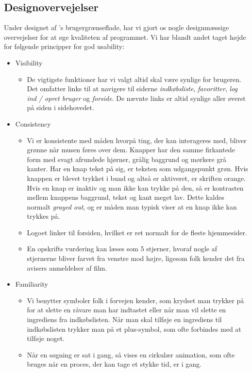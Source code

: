 \subsection{Designovervejelser}
\label{subsec:designovervejelser}

Under designet af \Foodl's brugergrænseflade, har vi gjort os nogle designmæssige overvejelser for at øge kvaliteten af programmet. Vi har blandt andet taget højde for følgende principper for god usability\cite[p.~90]{deb}:
\begin{itemize}

\item Visibility
  \begin{itemize}
  \item De vigtigste funktioner har vi valgt altid skal være synlige for brugeren. Det omfatter links til at navigere til siderne \textit{indkøbsliste}, \textit{favoritter}, \textit{log ind / opret bruger} og \textit{forside}. De nævnte links er altid synlige aller øverst på siden i sidehovedet.
  \end{itemize}
  
\item Consistency
  \begin{itemize}
  \item Vi er konsistente med måden hvorpå ting, der kan interageres med, bliver grønne når musen føres over dem. Knapper har den samme firkantede form med svagt afrundede hjørner, grålig baggrund og mørkere grå kanter. Har en knap tekst på sig, er teksten som udgangspunkt grøn. Hvis knappen er blevet trykket i bund og altså er aktiveret, er skriften orange. Hvis en knap er inaktiv og man ikke kan trykke på den, så er kontrasten mellem knappens baggrund, tekst og kant meget lav. Dette kaldes normalt \textit{grayed out}, og er måden man typisk viser at en knap ikke kan trykkes på.
  \item Logoet linker til forsiden, hvilket er ret normalt for de fleste hjemmesider.
  \item En opskrifts vurdering kan læses som 5 stjerner, hvoraf nogle af stjernerne bliver farvet fra venstre mod højre, ligesom folk kender det fra \fx avisers anmeldelser af film.
  \end{itemize}
  
\item Familiarity
  \begin{itemize}
  \item Vi benytter symboler folk i forvejen kender, som \fx krydset man trykker på for at slette en råvare man har indtastet eller når man vil slette en ingrediens fra indkøbslisten. Når man skal tilføje en ingrediens til indkøbslisten trykker man på et plus-symbol, som ofte forbindes med at tilføje noget.
  \item Når en søgning er sat i gang, så vises en cirkulær animation, som ofte bruges når en proces, der kan tage et stykke tid, er i gang.   
  \end{itemize}
  

\end{itemize}
